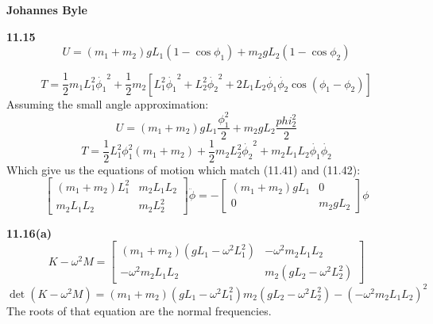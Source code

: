 \documentclass[english]{article}
\begin{document}
\begin{multicols*}{2}
\textbf{Johannes Byle}\\
\newcommand{\Lagr}{\mathcal{L}}

\noindent
\textbf{11.15}\\
$$U=(m_1+m_2)gL_1(1-\cos\phi_1)+m_2gL_2(1-\cos\phi_2)$$

$$T=\frac{1}{2}m_1L_1^2\dot{\phi_1}^2+\frac{1}{2}m_2[L_1^2\dot{\phi_1}^2+L_2^2\dot{\phi_2}^2+2L_1L_2\dot{\phi_1}\dot{\phi_2}\cos(\phi_1-\phi_2)]$$
Assuming the small angle approximation:
$$U=(m_1+m_2)gL_1\frac{\phi_1^2}{2}+m_2gL_2\frac{phi_2^2}{2}$$
$$T=\frac{1}{2}L_1^2\phi_1^2(m_1+m_2)+\frac{1}{2}m_2L_2^2\dot{\phi_2}^2+m_2L_1L_2\dot{\phi_1}\dot{\phi_2}$$
Which give us the equations of motion which match (11.41) and (11.42):
$$
\begin{bmatrix}
	(m_1+m_2)L_1^2 & m_2L_1L_2\\
	m_2L_1L_2 & m_2L_2^2
\end{bmatrix}
\ddot{\phi}=-
\begin{bmatrix}
	(m_1+m_2)gL_1 & 0\\
	0 & m_2gL_2
\end{bmatrix}
\phi
$$

\noindent
\textbf{11.16(a)}\\
$$K-\omega^2M=
\begin{bmatrix}
	(m_1+m_2)(gL_1-\omega^2L_1^2) & -\omega^2m_2L_1L_2\\
	-\omega^2m_2L_1L_2 & m_2(gL_2-\omega^2L_2^2)
\end{bmatrix}
$$
$$\det(K-\omega^2M)=
(m_1+m_2)(gL_1-\omega^2L_1^2)m_2(gL_2-\omega^2L_2^2)-(-\omega^2m_2L_1L_2)^2
$$
The roots of that equation are the normal frequencies.
\end{multicols*}
\end{document}
